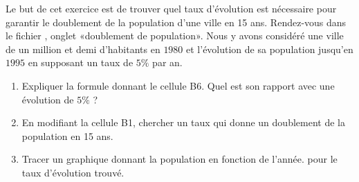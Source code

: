 
\begin{exercice}\label{exosmath-0312}

    Le but de cet exercice est de trouver quel taux d'évolution est nécessaire pour garantir le doublement de la population d'une ville en 15 ans. Rendez-vous dans le fichier , onglet «doublement de population». Nous y avons considéré une ville de un million et demi d'habitants en $1980$ et l'évolution de sa population jusqu'en \( 1995\) en supposant un taux de \( 5\%\) par an.

    \begin{enumerate}
        \item
            Expliquer la formule donnant le cellule B6. Quel est son rapport avec une évolution de \( 5\%\) ?
        \item
            En modifiant la cellule B1, chercher un taux qui donne un doublement de la population en 15 ans.
        \item
            Tracer un graphique donnant la population en fonction de l'année. pour le taux d'évolution trouvé.
    \end{enumerate}

\end{exercice}
